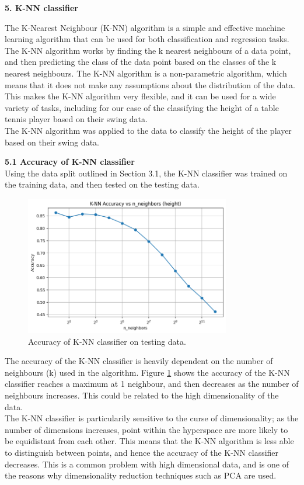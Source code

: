 \documentclass[12pt]{article}
\begin{document}
\vspace{20pt}

\textbf{5. K-NN classifier}

The K-Nearest Neighbour (K-NN) algorithm is a simple and effective machine learning algorithm that can be used for both classification and regression tasks. The K-NN algorithm works by finding the k nearest neighbours of a data point, and then predicting the class of the data point based on the classes of the k nearest neighbours. The K-NN algorithm is a non-parametric algorithm, which means that it does not make any assumptions about the distribution of the data. This makes the K-NN algorithm very flexible, and it can be used for a wide variety of tasks, including for our case of the classifying the height of a table tennis player based on their swing data.
\\
The K-NN algorithm was applied to the data to classify the height of the player based on their swing data.


\vspace{20pt}


\textbf{5.1 Accuracy of K-NN classifier}
\\
Using the data split outlined in Section 3.1, the K-NN classifier was trained on the training data, and then tested on the testing data. 

\begin{figure}[h!]
\centering
\includegraphics[width=0.8\textwidth]{figures/knn_accuracy.png}
\caption{Accuracy of K-NN classifier on testing data.}
\label{fig:knn_accuracy}
\end{figure}

The accuracy of the K-NN classifier is heavily dependent on the number of neighbours (k) used in the algorithm. Figure \ref{fig:knn_accuracy} shows the accuracy of the K-NN classifier reaches a maximum at 1 neighbour, and then decreases as the number of neighbours increases. This could be related to the high dimensionality of the data.
\\
The K-NN classifier is particularily sensitive to the curse of dimensionality; as the number of dimensions increases, point within the hyperspace are more likely to be equidistant from each other. This means that the K-NN algorithm is less able to distinguish between points, and hence the accuracy of the K-NN classifier decreases. This is a common problem with high dimensional data, and is one of the reasons why dimensionality reduction techniques such as PCA are used.
\\
\end{document}
